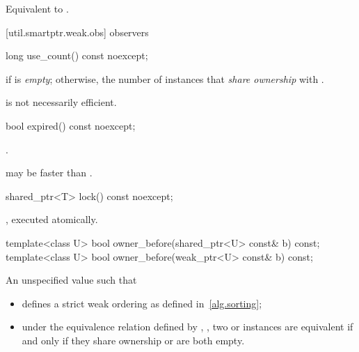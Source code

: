 \begin{itemdescr}
\pnum\effects  Equivalent to .
\end{itemdescr}

[util.smartptr.weak.obs]{ observers}
%
%
\begin{itemdecl}
long use_count() const noexcept;
\end{itemdecl}

\begin{itemdescr}
\pnum\returns  {} if  is \textit{empty};
otherwise, the number of  instances
that \textit{share ownership} with .

\pnum \enternote {} is not necessarily
efficient.\exitnote
\end{itemdescr}

%
%
\begin{itemdecl}
bool expired() const noexcept;
\end{itemdecl}

\begin{itemdescr}
\pnum\returns  {}.

\pnum \enternote  {} may be faster
than . \exitnote
\end{itemdescr}

%
%
\begin{itemdecl}
shared_ptr<T> lock() const noexcept;
\end{itemdecl}

\begin{itemdescr}
\pnum\returns  {}, executed atomically.
\end{itemdescr}

%
%
\begin{itemdecl}
template<class U> bool owner_before(shared_ptr<U> const& b) const;
template<class U> bool owner_before(weak_ptr<U> const& b) const;
\end{itemdecl}

\begin{itemdescr}
\pnum
\returns An unspecified value such that

\begin{itemize}
\item {} defines a strict weak ordering as defined in~\ref{alg.sorting};

\item under the equivalence relation defined by ,
, two  or
 instances are equivalent if and only if they share ownership or are
both empty.
\end{itemize}
\end{itemdescr}



